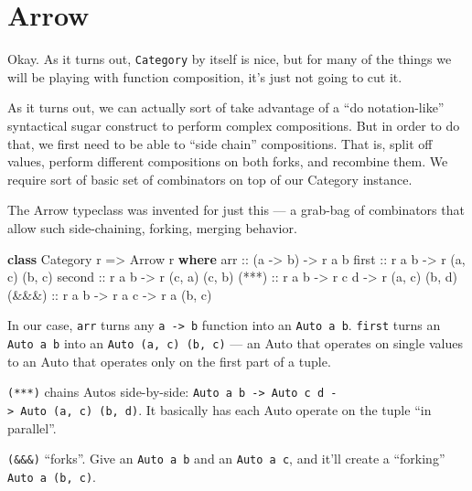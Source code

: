 \documentclass[]{article}
\newenvironment{Shaded}{}{}
\newcommand{\KeywordTok}[1]{\textcolor[rgb]{0.00,0.44,0.13}{\textbf{{#1}}}}
\newcommand{\DataTypeTok}[1]{\textcolor[rgb]{0.56,0.13,0.00}{{#1}}}
\newcommand{\OtherTok}[1]{\textcolor[rgb]{0.00,0.44,0.13}{{#1}}}
\newcommand{\NormalTok}[1]{{#1}}
\begin{document}
\section{Arrow}\label{arrow}

Okay. As it turns out, \texttt{Category} by itself is nice, but for many of the
things we will be playing with function composition, it's just not going to cut
it.

As it turns out, we can actually sort of take advantage of a ``do
notation-like'' syntactical sugar construct to perform complex compositions. But
in order to do that, we first need to be able to ``side chain'' compositions.
That is, split off values, perform different compositions on both forks, and
recombine them. We require sort of basic set of combinators on top of our
Category instance.

The Arrow typeclass was invented for just this --- a grab-bag of combinators
that allow such side-chaining, forking, merging behavior.

\begin{Shaded}
\begin{Highlighting}[]
\KeywordTok{class} \DataTypeTok{Category} \NormalTok{r }\OtherTok{=>} \DataTypeTok{Arrow} \NormalTok{r }\KeywordTok{where}
\OtherTok{    arr    ::} \NormalTok{(a }\OtherTok{->} \NormalTok{b) }\OtherTok{->} \NormalTok{r a b}
\OtherTok{    first  ::} \NormalTok{r a b }\OtherTok{->} \NormalTok{r (a, c) (b, c)}
\OtherTok{    second ::} \NormalTok{r a b }\OtherTok{->} \NormalTok{r (c, a) (c, b)}
\OtherTok{    (***)  ::} \NormalTok{r a b }\OtherTok{->} \NormalTok{r c d }\OtherTok{->} \NormalTok{r (a, c) (b, d)}
\OtherTok{    (&&&)  ::} \NormalTok{r a b }\OtherTok{->} \NormalTok{r a c }\OtherTok{->} \NormalTok{r a (b, c)}
\end{Highlighting}
\end{Shaded}

In our case, \texttt{arr} turns any \texttt{a\ -\textgreater{}\ b} function into
an \texttt{Auto\ a\ b}. \texttt{first} turns an \texttt{Auto\ a\ b} into an
\texttt{Auto\ (a,\ c)\ (b,\ c)} --- an Auto that operates on single values to an
Auto that operates only on the first part of a tuple.

\texttt{(***)} chains Autos side-by-side:
\texttt{Auto\ a\ b\ -\textgreater{}\ Auto\ c\ d\ -\textgreater{}\ Auto\ (a,\ c)\ (b,\ d)}.
It basically has each Auto operate on the tuple ``in parallel''.

\texttt{(\&\&\&)} ``forks''. Give an \texttt{Auto\ a\ b} and an
\texttt{Auto\ a\ c}, and it'll create a ``forking'' \texttt{Auto\ a\ (b,\ c)}.
\end{document}

